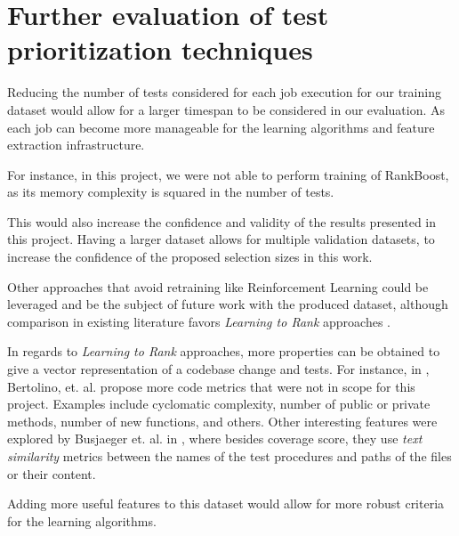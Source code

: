 \section{Further evaluation of test prioritization techniques}\label{s:future-evalp}
Reducing the number of tests considered for each job execution for our training
dataset would allow for a larger timespan to be considered in our evaluation.
As each job can become more manageable for the learning algorithms and feature
extraction infrastructure. 

For instance, in this project, we were not able
to perform training of RankBoost, as its memory complexity is squared in the
number of tests.

This would also increase the confidence and validity of the results presented in this 
project. Having a larger dataset allows for multiple validation datasets, to increase the
confidence of the proposed selection sizes in this work.

Other approaches that avoid retraining like Reinforcement Learning could be 
leveraged and be the subject of future work with the produced dataset, although
comparison in existing literature favors \emph{Learning to Rank} approaches \cite{Bertolino2020LearningtoRankVR}.

In regards to \emph{Learning to Rank} approaches, more properties can be
obtained to give a vector representation of a codebase change and tests. 
For instance, in \cite{Bertolino2020LearningtoRankVR}, Bertolino, et. al. propose more 
code metrics that were not in scope for this project. Examples include 
cyclomatic complexity, number of public or private methods, number of 
new functions, and others. Other interesting features were explored by Busjaeger et. al. in \cite{Busjaeger2016LearningFT}, 
where besides coverage score, they use \emph{text similarity} metrics between the 
names of the test procedures and paths of the files or their content. 

Adding more useful features to this dataset would allow for more
robust criteria for the learning algorithms.
